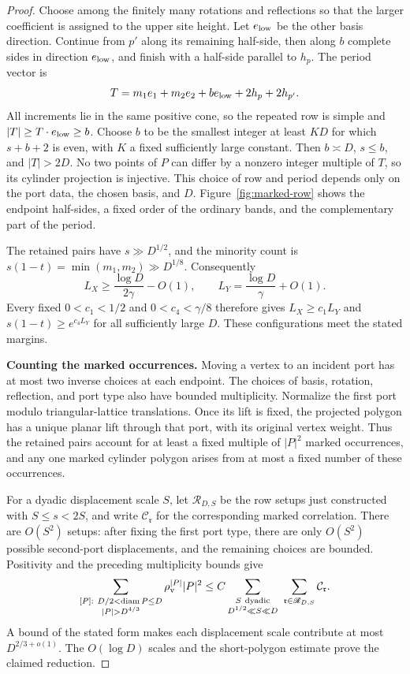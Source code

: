 \begin{proof}
Choose among the finitely many rotations and reflections so that the
larger coefficient is assigned to the upper site height. Let
$e_{\rm low}$ be the other basis direction. Continue from $p'$ along
its remaining half-side, then along $b$ complete sides in direction
$e_{\rm low}$, and finish with a half-side parallel to $h_p$. The
period vector is
\[
 T=m_1e_1+m_2e_2+b e_{\rm low}+2h_p+2h_{p'}.
\]
All increments lie in the same positive cone, so the repeated row is
simple and $|T|\ge T\cdot e_{\rm low}\ge b$. Choose $b$ to be the
smallest integer at least $KD$ for which $s+b+2$ is even, with $K$
a fixed sufficiently large constant. Then $b\asymp D$, $s\le b$,
and $|T|>2D$. No two points of $P$ can differ by a nonzero integer
multiple of $T$, so its cylinder projection is injective. This
choice of row and period depends only on the port data, the chosen
basis, and $D$. Figure~\ref{fig:marked-row} shows the endpoint
half-sides, a fixed order of the ordinary bands, and the complementary
part of the period.


The retained pairs have $s\gg D^{1/2}$, and the minority count is
$s(1-t)=\min(m_1,m_2)\gg D^{1/8}$. Consequently
\[
 L_X\ge\frac{\log D}{2\gamma}-O(1),\qquad
 L_Y=\frac{\log D}{\gamma}+O(1).
\]
Every fixed $0<c_1<1/2$ and $0<c_4<\gamma/8$ therefore gives
$L_X\ge c_1L_Y$ and $s(1-t)\ge e^{c_4L_Y}$ for all sufficiently
large $D$. These configurations meet the stated margins.

\par\smallskip\noindent\textbf{Counting the marked occurrences.}
Moving a vertex to an incident port has at most two inverse choices
at each endpoint. The choices of basis, rotation, reflection, and
port type also have bounded multiplicity. Normalize the first port
modulo triangular-lattice translations. Once its lift is fixed, the
projected polygon has a unique planar lift through that port, with
its original vertex weight. Thus the retained pairs account for at
least a fixed multiple of $|P|^2$ marked occurrences, and any one
marked cylinder polygon arises from at most a fixed number of these
occurrences.

For a dyadic displacement scale $S$, let $\mathscr R_{D,S}$ be the
row setups just constructed with $S\le s<2S$, and write
$\mathcal C_{\mathfrak r}$ for the corresponding marked correlation.
There are $O(S^2)$ setups: after fixing the first port type, there
are only $O(S^2)$ possible second-port displacements, and the
remaining choices are bounded. Positivity and the preceding
multiplicity bounds give
\[
 \sum_{\substack{[P]:\ D/2<\operatorname{diam}P\le D\\
                         |P|>D^{4/3}}}
       \rho_{\rm v}^{|P|}|P|^2
 \le C\sum_{\substack{S\ \text{dyadic}\\D^{1/2}\ll S\ll D}}
          \ \sum_{\mathfrak r\in\mathscr R_{D,S}}
                    \mathcal C_{\mathfrak r}.
\]
A bound of the stated form makes each displacement scale contribute
at most $D^{2/3+o(1)}$. The $O(\log D)$ scales and the
short-polygon estimate prove the claimed reduction.
\end{proof}

